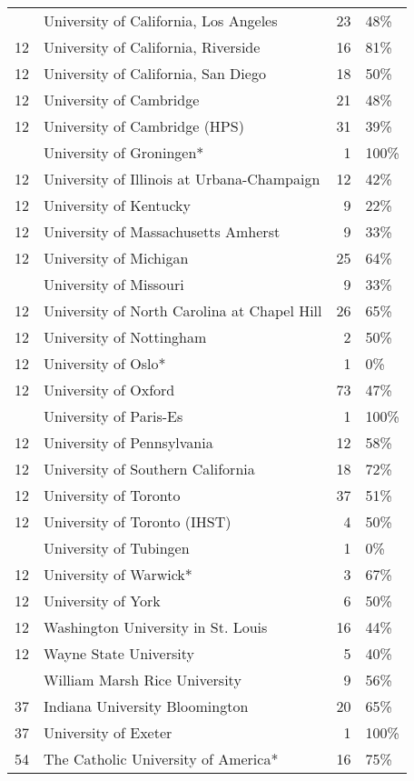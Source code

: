 \begin{table}
\begin{tabular}[t]{llrl}
\addlinespace
12 & University of California, Los Angeles & 23 & 48\%\\
12 & University of California, Riverside & 16 & 81\%\\
12 & University of California, San Diego & 18 & 50\%\\
12 & University of Cambridge & 21 & 48\%\\
12 & University of Cambridge (HPS) & 31 & 39\%\\
\addlinespace
12 & University of Groningen* & 1 & 100\%\\
12 & University of Illinois at Urbana-Champaign & 12 & 42\%\\
12 & University of Kentucky & 9 & 22\%\\
12 & University of Massachusetts Amherst & 9 & 33\%\\
12 & University of Michigan & 25 & 64\%\\
\addlinespace
12 & University of Missouri & 9 & 33\%\\
12 & University of North Carolina at Chapel Hill & 26 & 65\%\\
12 & University of Nottingham & 2 & 50\%\\
12 & University of Oslo* & 1 & 0\%\\
12 & University of Oxford & 73 & 47\%\\
\addlinespace
12 & University of Paris-Es & 1 & 100\%\\
12 & University of Pennsylvania & 12 & 58\%\\
12 & University of Southern California & 18 & 72\%\\
12 & University of Toronto & 37 & 51\%\\
12 & University of Toronto (IHST) & 4 & 50\%\\
\addlinespace
12 & University of Tubingen & 1 & 0\%\\
12 & University of Warwick* & 3 & 67\%\\
12 & University of York & 6 & 50\%\\
12 & Washington University in St. Louis & 16 & 44\%\\
12 & Wayne State University & 5 & 40\%\\
\addlinespace
12 & William Marsh Rice University & 9 & 56\%\\
37 & Indiana University Bloomington & 20 & 65\%\\
37 & University of Exeter & 1 & 100\%\\
54 & The Catholic University of America* & 16 & 75\%\\

\end{tabular}
\end{table}
